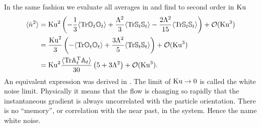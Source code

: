 \documentclass[thesis.tex]{subfiles}
\begin{document}
\newpage
In the same fashion we evaluate all averages in  and find to second order in $\mbox{Ku}$
\begin{align}
	\langle \dot n^2\rangle &=\ku^2 \left(-\frac{1}{3}\langle\tr\ma O_t\ma O_t\rangle +  \frac{\Lambda^2}{3}\langle\tr\ma S_t \ma S_t\rangle - \frac{2\Lambda^2}{15}\langle\tr\ma S_t\ma S_t \rangle\right) + \mathcal O(\ku^3)  \nn\\
	&= \frac{\ku^2}{3}\left(-\langle\tr\ma O_t\ma O_t\rangle +  \frac{3\Lambda^2}{5}\langle\tr\ma S_t \ma S_t\rangle\right) + \mathcal O(\ku^3)  \nn\\
	&= \ku^2\frac{\langle\tr\ma A_t\transpose \ma A_t\rangle}{30}\left(5 + 3 \Lambda^2\right)+ \mathcal O(\ku^3).  \eqnlab{ku2}
\end{align}
An equivalent expression was derived in \cite{shin2005}. The limit of $\mbox{Ku}\to0$ is called the white noise limit. Physically it means that the flow is changing so rapidly that the instantaneous gradient is always uncorrelated with the particle orientation. There is no ``memory'', or correlation with the near past, in the system. Hence the name white noise.
\end{document}
